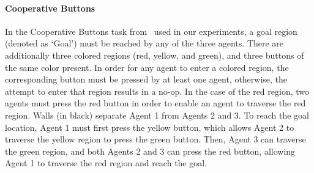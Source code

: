 


\paragraph{Cooperative Buttons} In the Cooperative Buttons task from~\cite{neary2020reward} used in our experiments, a goal region (denoted as `Goal') must be reached by any of the three agents. There are additionally three colored regions (red, yellow, and green), and three buttons of the same color present. In order for any agent to enter a colored region, the corresponding button must be pressed by at least one agent, otherwise, the attempt to enter that region results in a no-op. In the case of the red region, two agents must press the red button in order to enable an agent to traverse the red region. Walls (in black) separate Agent 1 from Agents 2 and 3. To reach the goal location, Agent 1 must first press the yellow button, which allows Agent 2 to traverse the yellow region to press the green button. Then, Agent 3 can traverse the green region, and both Agents 2 and 3 can press the red button, allowing Agent 1 to traverse the red region and reach the goal.

